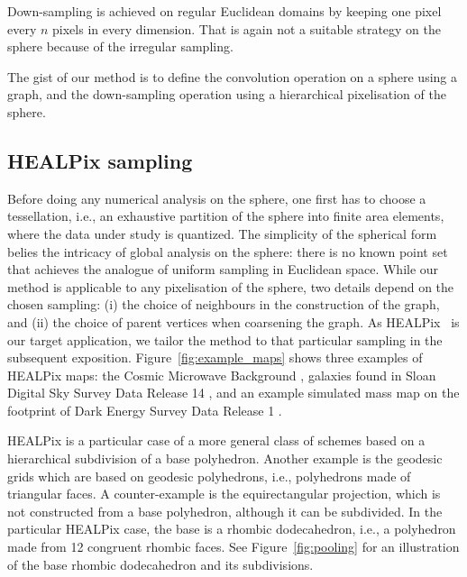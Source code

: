 \documentclass[final,twocolumn,3p,times,sort&compress]{elsarticle}
\newcommand{\figref}[1]{Figure~\ref{fig:#1}}
\newcommand{\1}{\b{1}}              %
\newcommand{\0}{\b{0}}              %
\begin{document}
Down-sampling is achieved on regular Euclidean domains by keeping one pixel every $n$ pixels in every dimension.
That is again not a suitable strategy on the sphere because of the irregular sampling.

The gist of our method is to define the convolution operation on a sphere using a graph, and the down-sampling operation using a hierarchical pixelisation of the sphere.


\subsection{HEALPix sampling}
\label{sec:healpix}

Before doing any numerical analysis on the sphere, one first has to choose a tessellation, i.e., an exhaustive partition of the sphere into finite area elements, where the data under study is quantized.
The simplicity of the spherical form belies the intricacy of global analysis on the sphere: there is no known point set that achieves the analogue of uniform sampling in Euclidean space.
While our method is applicable to any pixelisation of the sphere, two details depend on the chosen sampling: (i) the choice of neighbours in the construction of the graph, and (ii) the choice of parent vertices when coarsening the graph.
As HEALPix~\citep{gorski2005healpix} is our target application, we tailor the method to that particular sampling in the subsequent exposition.
\figref{example_maps} shows three examples of HEALPix maps: the Cosmic Microwave Background \citep{planck2015overview}, galaxies found in Sloan Digital Sky Survey Data Release 14 \citep{abolfathi2017sdssDR14}, and an example simulated mass map on the footprint of Dark Energy Survey Data Release 1 \citep{des2018dr1}.

HEALPix is a particular case of a more general class of schemes based on a hierarchical subdivision of a base polyhedron.
Another example is the geodesic grids which are based on geodesic polyhedrons, i.e., polyhedrons made of triangular faces. A counter-example is the equirectangular projection, which is not constructed from a base polyhedron, although it can be subdivided.
In the particular HEALPix case, the base is a rhombic dodecahedron, i.e., a polyhedron made from 12 congruent rhombic faces.
See \figref{pooling} for an illustration of the base rhombic dodecahedron and its subdivisions.
\end{document}
